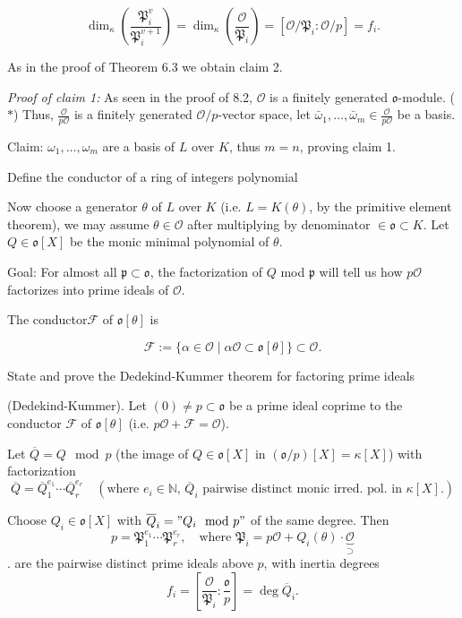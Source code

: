 \[
\dim_\kappa ( \frac{\mathfrak{P}_i^v}{\mathfrak{P}_i^{v+1}} ) = \dim_\kappa ( \frac{\mathcal{O}}{\mathfrak{P}_i} ) = [\mathcal{O}/\mathfrak{P}_i : \mathcal{O}/p] = f_i.
\]

As in the proof of Theorem 6.3 we obtain claim 2.

\textit{Proof of claim 1:} As seen in the proof of 8.2, \(\mathcal{O}\) is a finitely generated \(\mathfrak{o}\)-module. (\(*\)) Thus, \(\frac{\mathcal{O}}{p\mathcal{O}}\) is a finitely generated \(\mathcal{O}/p\)-vector space, let \(\bar{\omega}_1, \ldots, \bar{\omega}_m \in \frac{\mathcal{O}}{p\mathcal{O}}\) be a basis.

Claim: \(\omega_1, \ldots, \omega_m\) are a basis of \(L\) over \(K\), thus \(m = n\), proving claim 1.


Define the conductor of a ring of integers polynomial

Now choose a generator \(\theta\) of \(L\) over \(K\) (i.e. \(L = K(\theta)\), by the primitive element theorem), 
we may assume \(\theta \in \mathcal{O}\) after multiplying by denominator \(\in \mathfrak{o} \subset K\).
Let \(Q \in \mathfrak{o}[X]\) be the monic minimal polynomial of \(\theta\).

Goal: For almost all \(\mathfrak{p} \subset \mathfrak{o}\), the factorization of \(Q\) mod \(\mathfrak{p}\) will tell us how \(p \mathcal{O}\) factorizes into prime ideals of \(\mathcal{O}\).

The conductor\(\mathcal{F}\) of \(\mathfrak{o}[\theta]\) is

\[
\mathscr{F} := \{ \alpha \in \mathcal{O} \mid \alpha \mathcal{O} \subset \mathfrak{o}[\theta] \} \subset \mathcal{O}.
\]


State and prove the Dedekind-Kummer theorem for factoring prime ideals

(Dedekind-Kummer). 
Let \( (0) \neq p \subset \mathfrak{o} \) be a prime ideal coprime to the conductor \(\mathscr{F}\) of \(\mathfrak{o}[\theta]\) 
(i.e. \( p\mathcal{O} + \mathscr{F} = \mathcal{O} \)).

Let \(\overline{Q} = Q \mod p\) (the image of \(Q \in \mathfrak{o}[X]\) in \( (\mathfrak{o}/p)[X] = \kappa[X]\)) with factorization
\[
\overline{Q} = \overline{Q}_1^{e_1} \cdots \overline{Q}_r^{e_r} \quad \left( \text{where } e_i \in \mathbb{N}, \, \overline{Q}_i \text{ pairwise distinct monic irred. pol. in } \kappa[X]. \right)
\]

Choose \( Q_i \in \mathfrak{o}[X] \) with \(\overline{Q}_i = "Q_i \mod p"\) of the same degree. Then
\[
p = \mathfrak{P}_1^{e_1} \cdots \mathfrak{P}_r^{e_r}, \quad \text{where } \mathfrak{P}_i = p\mathcal{O} + Q_i(\theta) \cdot \underbrace{\mathcal{O}}_{\supset}
\].
are the pairwise distinct prime ideals above \( p \), with inertia degrees
\[
f_i = \left[ \frac{\mathcal{O}}{\mathfrak{P}_i} : \frac{\mathfrak{o}}{p} \right] = \deg \overline{Q}_i.
\]

